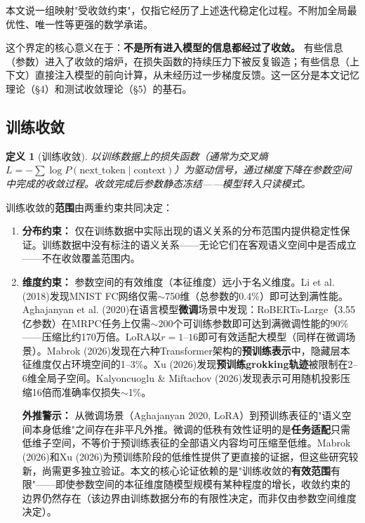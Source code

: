 \documentclass[11pt,a4paper]{ctexart}
\newtheorem{definition}[theorem]{定义}
\begin{document}
本文说一组映射"受收敛约束"，仅指它经历了上述迭代稳定化过程。不附加全局最优性、唯一性等更强的数学承诺。

这个界定的核心意义在于：\textbf{不是所有进入模型的信息都经过了收敛。} 有些信息（参数）进入了收敛的熔炉，在损失函数的持续压力下被反复锻造；有些信息（上下文）直接注入模型的前向计算，从未经历过一步梯度反馈。这一区分是本文记忆理论（§4）和测试收敛理论（§5）的基石。

\subsection{训练收敛}

\begin{definition}[训练收敛]
    以训练数据上的损失函数（通常为交叉熵$L = -\sum \log P(\mathrm{next\_token} \mid \mathrm{context})$）为驱动信号，通过梯度下降在参数空间中完成的收敛过程。收敛完成后参数静态冻结——模型转入只读模式。
\end{definition}

训练收敛的\textbf{范围}由两重约束共同决定：
\begin{enumerate}[leftmargin=*]
    \item \textbf{分布约束：} 仅在训练数据中实际出现的语义关系的分布范围内提供稳定性保证。训练数据中没有标注的语义关系——无论它们在客观语义空间中是否成立——不在收敛覆盖范围内。
    \item \textbf{维度约束：} 参数空间的有效维度（本征维度）远小于名义维度。Li et al. (2018)\cite{Li2018IntrinsicDim}发现MNIST FC网络仅需$\sim$750维（总参数的0.4\%）即可达到满性能。Aghajanyan et al. (2020)\cite{Aghajanyan2020}在语言模型\textbf{微调}场景中发现：RoBERTa-Large（3.55亿参数）在MRPC任务上仅需$\sim$200个可训练参数即可达到满微调性能的90\%——压缩比约170万倍。LoRA\cite{Hu2021LoRA}以$r=1$--$16$即可有效适配大模型（同样在微调场景）。Mabrok (2026)\cite{Mabrok2026Latent}发现在六种Transformer架构的\textbf{预训练表示}中，隐藏层本征维度仅占环境空间的1--3\%。Xu (2026)\cite{Xu2026Holographic}发现\textbf{预训练grokking轨迹}被限制在2--6维全局子空间。Kalyoncuoglu \& Miftachov (2026)发现表示可用随机投影压缩16倍而准确率仅损失$\sim$1\%。

\textbf{外推警示：} 从微调场景（Aghajanyan 2020, LoRA）到预训练表征的"语义空间本身低维"之间存在非平凡外推。微调的低秩有效性证明的是\textbf{任务适配}只需低维子空间，不等价于预训练表征的全部语义内容均可压缩至低维。Mabrok (2026)和Xu (2026)为预训练阶段的低维性提供了更直接的证据，但这些研究较新，尚需更多独立验证。本文的核心论证依赖的是"训练收敛的\textbf{有效范围}有限"——即使参数空间的本征维度随模型规模有某种程度的增长，收敛约束的边界仍然存在（该边界由训练数据分布的有限性决定，而非仅由参数空间维度决定）。
\end{enumerate}
\end{document}
